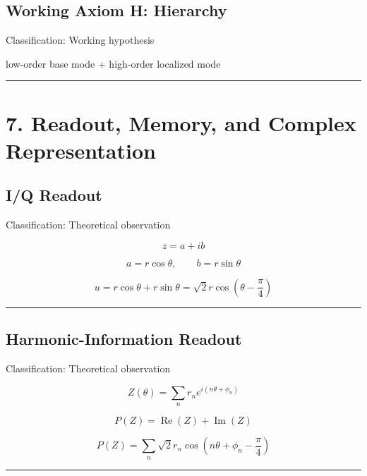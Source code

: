 \documentclass[
  a4paper,
]{article}
\newenvironment{Shaded}{}{}
\newcommand{\NormalTok}[1]{#1}
\begin{document}
\subsection{Working Axiom H: Hierarchy}\label{working-axiom-h-hierarchy}

Classification: Working hypothesis

\begin{Shaded}
\begin{Highlighting}[]
\NormalTok{low{-}order base mode}
\NormalTok{+ high{-}order localized mode}
\end{Highlighting}
\end{Shaded}

\begin{center}\rule{0.5\linewidth}{0.5pt}\end{center}

\section{7. Readout, Memory, and Complex
Representation}\label{readout-memory-and-complex-representation}

\subsection{I/Q Readout}\label{iq-readout}

Classification: Theoretical observation

\[
z=a+ib
\]

\[
a=r\cos\theta,\qquad b=r\sin\theta
\]

\[
u=r\cos\theta+r\sin\theta
=\sqrt2 r\cos\left(\theta-\frac{\pi}{4}\right)
\]

\begin{center}\rule{0.5\linewidth}{0.5pt}\end{center}

\subsection{Harmonic-Information
Readout}\label{harmonic-information-readout}

Classification: Theoretical observation

\[
Z(\theta)=\sum_n r_n e^{i(n\theta+\phi_n)}
\]

\[
P(Z)=\operatorname{Re}(Z)+\operatorname{Im}(Z)
\]

\[
P(Z)=\sum_n \sqrt2 r_n
\cos\left(n\theta+\phi_n-\frac{\pi}{4}\right)
\]

\begin{center}\rule{0.5\linewidth}{0.5pt}\end{center}
\end{document}
